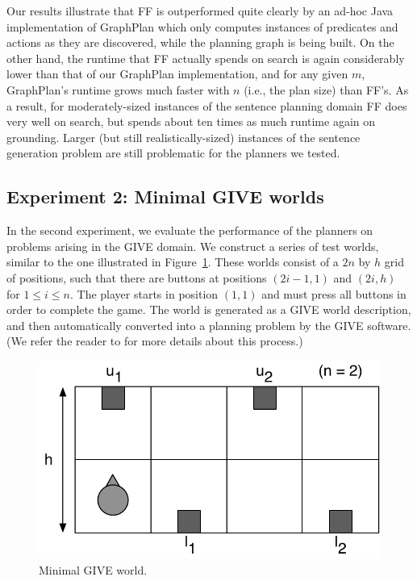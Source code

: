 Our results illustrate that FF is outperformed quite clearly by an ad-hoc
Java implementation of GraphPlan which only computes instances of
predicates and actions as they are discovered, while the planning graph is
being built. On the other hand, the runtime that FF actually spends on
search is again considerably lower than that of our GraphPlan
implementation, and for any given $m$, GraphPlan's runtime grows much
faster with $n$ (i.e., the plan size) than FF's. As a result, for
moderately-sized instances of the sentence planning domain FF does very
well on search, but spends about ten times as much runtime again on
grounding. Larger (but still realistically-sized) instances of the sentence
generation problem are still problematic for the planners we tested.



\subsection{Experiment 2: Minimal GIVE worlds}
\label{sec:exper-2:-minim}

In the second experiment, we evaluate the performance of the planners on
problems arising in the GIVE domain. We construct a series of test worlds,
similar to the one illustrated in Figure~\ref{fig:give-minimal}. These worlds
consist of a $2n$ by $h$ grid of positions, such that there are buttons at
positions $(2i-1,1)$ and $(2i,h)$ for $1 \leq i \leq n$. The player starts
in position $(1,1)$ and must press all buttons in order to complete the
game. The world is generated as a GIVE world description, and then
automatically converted into a planning problem by the GIVE software.  (We
refer the reader to  for more details about this process.)

\begin{figure}
  \centering
  \includegraphics[width=0.8\columnwidth]{pic-buttons}
  \caption{Minimal GIVE world.}
  \label{fig:give-minimal}
\end{figure}

